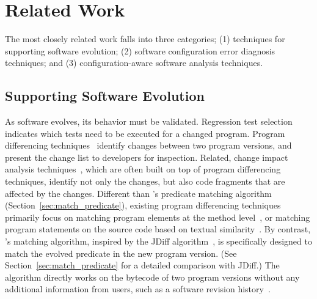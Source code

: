 \section{Related Work}
\label{sec:related}

The most closely related work falls into
three categories; (1) techniques for
supporting software evolution; (2) software
configuration error diagnosis techniques;
and (3) configuration-aware software analysis techniques.

\subsection{Supporting Software Evolution}

As software evolves, its behavior must be validated.
Regression test selection~\cite{regression}
indicates which tests need to be executed for a changed
program.  Program differencing techniques~\cite{Giroux:2006:DIF, Xing:2005:UAO, Thummalapenta:2010:ESM, Kim:2013, Jin:2012:BRF,Nguyen:2010:RBF,Dig:2006:ADR, Kamiya:2002:CMT, Dagenais:2008}
identify changes between two program versions,
and present the change list to developers for inspection.
Related, change impact analysis techniques~\cite{STVR:STVR1475}, which
are often built on top of program differencing
techniques, identify not only the changes, but also
code fragments that are affected by the changes. 
Different than \ourtool's predicate matching
algorithm (Section~\ref{sec:match_predicate}),
existing program differencing techniques primarily focus on matching
program elements at the method level~\cite{frameworkevolution,
Xing:2005:UAO, Kim:2013, Nguyen:2010:RBF,Dig:2006:ADR,
Kamiya:2002:CMT, Dagenais:2008},
or matching program statements on the source code based on
textual similarity~\cite{Horwitz:1990:IST}.
By contrast, \ourtool's matching algorithm, inspired by
the JDiff algorithm~\cite{Apiwattanapong:2004}, is specifically designed 
to match the evolved predicate in the new program version.
(See Section~\ref{sec:match_predicate} for a detailed
comparison with JDiff.)
The algorithm directly works on the bytecode of two program
versions without any additional information from users,
such as a software revision history~\cite{frameworkevolution}.


